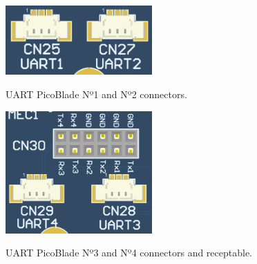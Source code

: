 \begin{figure}[!ht]
    \begin{center}
        \includegraphics[width=0.5\textwidth]{figures/picoblade_uarts_n1_and_n2}
        \caption{UART PicoBlade Nº1 and Nº2 connectors.}
        \label{fig:uart-picoblades-1}
        \includegraphics[width=0.5\textwidth]{figures/picoblade_uarts_n3_and_n4_and_receptable.png}
        \caption{UART PicoBlade Nº3 and Nº4 connectors and receptable.}
        \label{fig:uart-picoblades-2}
    \end{center}
\end{figure}
